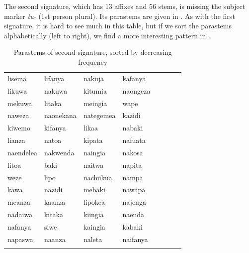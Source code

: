 \documentclass[output=paper,colorlinks,citecolor=brown]{langscibook}
\begin{document}
The second signature, which has 13 affixes and 56 stems, is missing the subject marker \textit{tu-} (1st person plural). Its parastems are given in . As with the first signature, it is hard to see much in this table, but if we sort the parastems alphabetically (left to right), we find a more interesting pattern in .



\begin{table}
\begin{tabular}{*4{ll}} 
	\lsptoprule
lisema &     lifanya &     nakuja &     kafanya \\ 
likuwa&      nakuwa &      kitumia &    naongeza \\ 
mekuwa &     litaka &      meingia &    wape \\ 
naweza &     naonekana &   nategemea &  kazidi \\ 
kiwemo &     kifanya &     likaa &      nabaki \\ 
lianza &     natoa &       kipata &     nafuata \\ 
naendelea &  nakwenda &    naingia &    nakosa \\ 
litoa &      baki &        naitwa &     napita \\ 
weze &       lipo &        nachukua &   nampa \\ 
kawa &       nazidi &      mebaki &     nawapa \\ 
meanza &     kaanza &      lipokea &    najenga \\ 
nadaiwa &    kitaka &      kiingia &    naenda \\ 
nafanya &    siwe &        kaingia &    kabaki \\ 
napaswa &    naanza &      naleta &     naifanya \\  
\lspbottomrule
\end{tabular}
\caption{Parastems of second signature, sorted by decreasing frequency\label{2ndsignatureparastems}}
\end{table}
\end{document}
